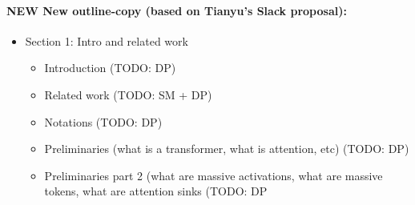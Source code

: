 \paragraph{NEW New outline-copy (based on Tianyu's Slack proposal): }
\begin{itemize}
    \item Section 1: Intro and related work
    \begin{itemize}
        \item Introduction (TODO: DP)
        \item Related work (TODO: SM + DP)
        \item Notations (TODO: DP)
        \item Preliminaries (what is a transformer, what is attention, etc) (TODO: DP)
        \item Preliminaries part 2 (what are massive activations, what are massive tokens, what are attention sinks (TODO: DP
    \end{itemize}


\end{itemize}
